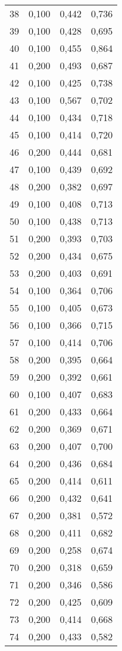 \begin{longtable}{|l|l|l|l|}
        38&0,100&0,442&0,736\\
        39&0,100&0,428&0,695\\
        40&0,100&0,455&0,864\\
        41&0,200&0,493&0,687\\
        42&0,100&0,425&0,738\\
        43&0,100&0,567&0,702\\
        44&0,100&0,434&0,718\\
        45&0,100&0,414&0,720\\
        46&0,200&0,444&0,681\\
        47&0,100&0,439&0,692\\
        48&0,200&0,382&0,697\\
        49&0,100&0,408&0,713\\
        50&0,100&0,438&0,713\\
        51&0,200&0,393&0,703\\
        52&0,200&0,434&0,675\\
        53&0,200&0,403&0,691\\
        54&0,100&0,364&0,706\\
        55&0,100&0,405&0,673\\
        56&0,100&0,366&0,715\\
        57&0,100&0,414&0,706\\
        58&0,200&0,395&0,664\\
        59&0,200&0,392&0,661\\
        60&0,100&0,407&0,683\\
        61&0,200&0,433&0,664\\
        62&0,200&0,369&0,671\\
        63&0,200&0,407&0,700\\
        64&0,200&0,436&0,684\\
        65&0,200&0,414&0,611\\
        66&0,200&0,432&0,641\\
        67&0,200&0,381&0,572\\
        68&0,200&0,411&0,682\\
        69&0,200&0,258&0,674\\
        70&0,200&0,318&0,659\\
        71&0,200&0,346&0,586\\
        72&0,200&0,425&0,609\\
        73&0,200&0,414&0,668\\
        74&0,200&0,433&0,582\\

\end{longtable}
